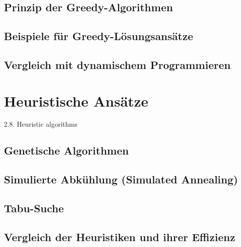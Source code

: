 \documentclass[12pt]{report}
\begin{document}
\pagebreak
\section{Prinzip der Greedy-Algorithmen}

\pagebreak
\section{Beispiele für Greedy-Lösungsansätze}

\pagebreak
\section{Vergleich mit dynamischem Programmieren}



\newpage
\chapter{Heuristische Ansätze}
2.8. Heuristic algorithms \cite{martello1987algorithms}



\pagebreak
\section{Genetische Algorithmen}

\pagebreak
\section{Simulierte Abkühlung (Simulated Annealing)}

\pagebreak
\section{Tabu-Suche}

\pagebreak
\section{Vergleich der Heuristiken und ihrer Effizienz}
\end{document}
